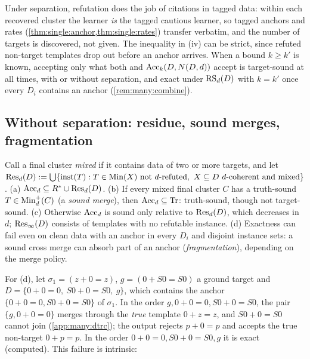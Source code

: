 Under separation, refutation does the job of citations in tagged data: within each recovered cluster the learner
\emph{is} the tagged cautious learner, so tagged anchors and rates (\cref{thm:single:anchor,thm:single:rates}) transfer verbatim, and the number of
targets is discovered, not given. The inequality in (iv) can be strict, since refuted non-target templates drop out before an anchor arrives. When a bound $k\ge k'$ is known, accepting
only what both \DTRC{} and $\mathrm{Acc}_k(D,N(D,d))$ accept is target-sound at all times, with or without separation, and exact
under $\mathrm{RS}_d(D)$ with $k=k'$ once every $D_i$ contains an anchor (\cref{rem:many:combine}).

\subsection{Without separation: residue, sound merges, fragmentation}\label{sec:many:residue}

\begin{theorem}\label{thm:many:residue}
Call a final cluster \emph{mixed} if it contains data of two or more targets, and let
$\mathrm{Res}_d(D):=\bigcup\{\mathrm{inst}(T):T\in\mathrm{Min}(X)\text{ not }d\text{-refuted},\ X\subseteq D\text{ $d$-coherent and mixed}\}$.
(a) $\mathrm{Acc}_d\subseteq R^{*}\cup\mathrm{Res}_d(D)$. (b) If every mixed final cluster $C$ has a truth-sound $T\in\mathrm{Min}_d^+(C)$
(a \emph{sound merge}), then $\mathrm{Acc}_d\subseteq\mathrm{Tr}$: truth-sound, though not target-sound. (c) Otherwise $\mathrm{Acc}_d$ is sound
only relative to $\mathrm{Res}_d(D)$, which decreases in $d$; $\mathrm{Res}_\infty(D)$ consists of templates with no refutable instance.
(d) Exactness can fail even on clean data with an anchor in every $D_i$ and disjoint instance sets: a sound cross merge
can absorb part of an anchor (\emph{fragmentation}), depending on the merge policy.
\end{theorem}

For (d), let $\sigma_1=(z+0=z)$, $g=(0+S0=S0)$ a ground target and $D=\{0+0=0,\ S0+0=S0,\ g\}$, which contains the
anchor $\{0+0=0,S0+0=S0\}$ of $\sigma_1$. In the order $g,0+0=0,S0+0=S0$, the pair $\{g,0+0=0\}$ merges through the
\emph{true} template $0+z=z$, and $S0+0=S0$ cannot join (\cref{app:many:dtrc}); the output rejects $p+0=p$ and accepts
the true non-target $0+p=p$. In the order $0+0=0,S0+0=S0,g$ it is exact (computed). This failure is intrinsic:

